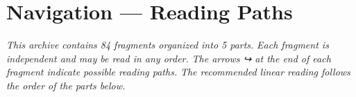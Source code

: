 \documentclass[14pt,openany]{extbook}
\begin{document}
\hypersetup{pageanchor=false}
\frontmatter





\ifdefined\MolambudosKDPNoFolios
  \makeatletter
  \let\ps@plain\ps@empty
  \makeatother
  \pagestyle{empty}
\fi
\ifdefined\MolambudosKDPSafeFolios
  \setlength{\footskip}{6mm}
  \pagestyle{molambudos-kdp-folios}
\fi

\pagecolor{sepiabg}
\color{sepiaink}





\cleardoublepage




\pagestyle{fancy}
\ifdefined\MolambudosKDPNoFolios
  \pagestyle{empty}
\fi
\ifdefined\MolambudosKDPSafeFolios
  \pagestyle{molambudos-kdp-folios}
\fi

\chapter*{Navigation --- Reading Paths}

\noindent\textit{This archive contains 84 fragments organized into 5 parts.}
\textit{Each fragment is independent and may be read in any order.}
\textit{The arrows ↪ at the end of each fragment indicate possible reading paths.}
\textit{The recommended linear reading follows the order of the parts below.}
\end{document}
